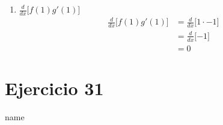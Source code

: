 \documentclass[12pt]{article}
\begin{document}
\begin{enumerate}[label=(\alph*)]
\item $\frac{d}{dx} \lbrack f(1)g'(1) \rbrack$
  \begin{equation*}
    \begin{split}
      \frac{d}{dx} \lbrack f(1)g'(1) \rbrack
      & = \frac{d}{dx} \lbrack 1 \cdot -1 \rbrack \\
      & = \frac{d}{dx} \lbrack -1 \rbrack \\
      & = 0
    \end{split}
  \end{equation*}
  
\end{enumerate}

\section{Ejercicio 31} name \\
\end{document}
